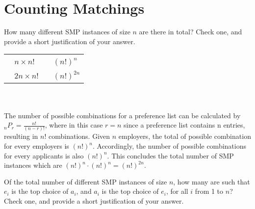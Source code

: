 \documentclass[11pt,fleqn]{exam}
\newcommand{\fillinMCmath}[1]{\begin{tikzpicture}\draw circle [radius=0.5em];\end{tikzpicture}\ #1}
\newcommand{\fillinMCmathsoln}[1]{\begin{tikzpicture}\draw[black, fill=blue] circle [radius=0.5em];\end{tikzpicture}\ #1}
\newif\ifsolutions\solutionsfalse
\newenvironment{soln}{\color{solnblue}}{}
\begin{document}
\section{Counting Matchings}
\begin{questions}
  \question[2]
  How many different SMP instances of size $n$ are there in total? Check one, and provide a short justification of your answer.

  \vspace{.1in}

  \ifsolutions
    
  \else

    \begin{tabular}{ll}
      \hspace{1in} \fillinMCmath{} $n \times n!$ \hspace*{1.2in}  & \fillinMCmath{} $(n!)^{n}$      \\
      \hspace{1in} \fillinMCmath{} $2n \times n!$ \hspace*{1.2in} & \fillinMCmathsoln{} $(n!)^{2n}$
    \end{tabular}
    \\
    \begin{soln}\\
      The number of possible combinations for a preference list can be calculated by $_nP_r = \frac{n!}{(n-r)!}$, where in this case $r = n$ since a preference list contains n entries, resulting in $n!$ combinations. Given $n$ employers, the total of possible combination for every employers is $(n!)^n$. Accordingly, the number of possible combinations for every applicants is also $(n!)^n$. This concludes the total number of SMP instances which are $(n!)^n\cdot (n!)^n= (n!)^{2n}$.
    \end{soln}
  \fi

  \vspace{.1in}


  \question[2]
  Of the total number of different SMP instances of size $n$, how many are such that $e_i$ is the top choice of $a_i$, and $a_i$ is the top choice of $e_i$, for all $i$ from 1 to $n$? Check one, and provide a short justification of your answer.

  \vspace{.1in}


\end{questions}
\end{document}
